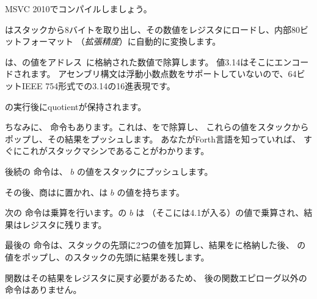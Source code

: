 ﻿

MSVC 2010でコンパイルしましょう。



\FLD はスタックから8バイトを取り出し、その数値をレジスタにロードし、内部80ビットフォーマット
（\emph{拡張精度}）に自動的に変換します。


\FDIV は、の値をアドレス~に格納された数値で除算します。
値3.14はそこにエンコードされます。
アセンブリ構文は浮動小数点数をサポートしていないので、64ビットIEEE 754形式での3.14の16進表現です。

\FDIV {}の実行後に\gls{quotient}が保持されます。


ちなみに、 \FDIVP 命令もあります。これは、をで除算し、
これらの値をスタックからポップし、その結果をプッシュします。
あなたがForth言語\FNURLFORTH を知っていれば、
すぐにこれがスタックマシン\FNURLSTACK であることがわかります。

後続の \FLD 命令は、 $b$ の値をスタックにプッシュします。

その後、商はに置かれ、は $b$ の値を持ちます。


次の \FMUL 命令は乗算を行います。の $b$ は
（そこには4.1が入る）の値で乗算され、結果はレジスタに残ります。


最後の \FADDP 命令は、スタックの先頭に2つの値を加算し、結果をに格納した後、
の値をポップし、のスタックの先頭に結果を残します。

関数はその結果をレジスタに戻す必要があるため、
\FADDP 後の関数エピローグ以外の命令はありません。



